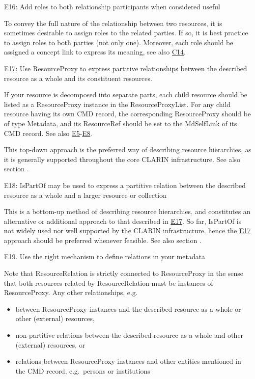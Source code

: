 E16: Add roles to both relationship participants when considered useful

 

To convey the full nature of the relationship between two resources, it is sometimes desirable to assign roles to the related parties. If so, it is best practice to assign roles to both parties (not only one). Moreover, each role should be assigned a concept link to express its meaning, see also \hyperref[c14]{C14}.

\label{e17}
E17: Use ResourceProxy to express partitive relationships between the described resource as a whole and its constituent resources.


If your resource is decomposed into separate parts, each child resource should be listed as a ResourceProxy instance in the ResourceProxyList. For any child resource having its own CMD record, the corresponding ResourceProxy should be of type Metadata, and its ResourceRef should be set to the MdSelfLink of its CMD record. See also \hyperref[e5]{E5}-\hyperref[e8]{E8}.

This top-down approach is the preferred way of describing resource hierarchies, as it is generally supported throughout the core CLARIN infrastructure. See also section .

E18: IsPartOf may be used to express a partitive relation between the described resource as a whole and a larger resource or collection

 

This is a bottom-up method of describing resource hierarchies, and constitutes an alternative or additional approach to that described in \hyperref[e17]{E17}. So far, IsPartOf is not widely used nor well supported by the CLARIN infrastructure, hence the \hyperref[e17]{E17} approach should be preferred whenever feasible. See also section .

E19. Use the right mechanism to define relations in your metadata


Note that ResourceRelation is strictly connected to ResourceProxy in the sense that both resources related by ResourceRelation must be instances of ResourceProxy. Any other relationships, e.g.

\begin{itemize}
\tightlist
\item
  between ResourceProxy instances and the described resource as a whole or other (external) resources,
\item
  non-partitive relations between the described resource as a whole and other (external) resources, or
\item
  relations between ResourceProxy instances and other entities mentioned in the CMD record, e.g.~persons or institutions
\end{itemize}

